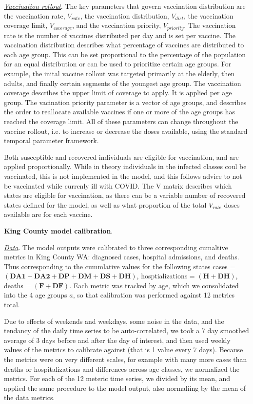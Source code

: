 \documentclass[11pt]{article}
\begin{document}
\underline{\it Vaccination rollout}. The key parameters that govern vaccination distribution are the vaccination rate, $V_{rate}$, the vaccination distribution, $V_{dist}$, the vaccination coverage limit, $V_{coverage}$, and the vaccination priority, $V_{priority}$. The vaccination rate is the number of vaccines distributed per day and is set per vaccine. The vaccination distribution describes what percentage of vaccines are distributed to each age group. This can be set proportional to the percentage of the population for an equal distribution or can be used to prioritize certain age groups. For example, the inital vaccine rollout was targeted primarily at the elderly, then adults, and finally certain segments of the youngest age group. The vaccination coverage describes the upper limit of coverage to apply. It is applied per age group. The vacination priority parameter is a vector of age groups, and describes the order to reallocate available vaccines if one or more of the age groups has reached the coverage limit. All of these parameters can change throughout the vaccine rollout, i.e. to increase or decrease the doses available, using the standard temporal parameter framework.

Both susceptible and recovered individuals are eligible for vaccination, and are applied proportionally. While in theory individuals in the infected classes coul be vaccinated, this is not implemented in the model, and this follows advice to not be vaccinated while currenly ill with COVID. The V matrix describes which states are eligible for vaccination, as there can be a variable number of recovered states defined for the model, as well as what proportion of the total $V_{rate}$ doses available are for each vaccine.


{\bf King County model calibration}. 

\underline{\it Data}. The model outputs were calibrated to three corresponding cumaltive metrics in King County WA: diagnosed cases, hospital admissions, and deaths. Thus corresponding to the cummlative values for the following states {cases = $(\mathbf{DA1} + \mathbf{DA2} + \mathbf{DP} + \mathbf{DM} + \mathbf{DS} + \mathbf{DH})$, hosptializations = $(\mathbf{H} + \mathbf{DH})$, deaths = $(\mathbf{F} + \mathbf{DF})$}. Each metric was tracked by age, which we consolidated into the 4 age groups $a$, so that calibration was performed against 12 metrics total.

Due to effects of weekends and weekdays, some noise in the data, and the tendancy of the daily time series to be auto-correlated, we took a 7 day smoothed average of 3 days before and after the day of interest, and then used weekly values of the metrics to calibrate against (that is 1 value every 7 days). Because the metrics were on very different scales, for example with many more cases than deaths or hospitalizations and differences across age classes, we normalized the metrics. For each of the 12 meteric time series, we divided by its mean, and applied the same procedure to the model output, also normaliing by the mean of the data metrics.
\end{document}
